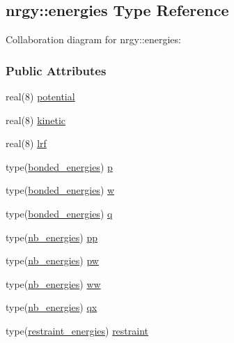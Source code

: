\hypertarget{structnrgy_1_1energies}{\subsection{nrgy\-:\-:energies Type Reference}
\label{structnrgy_1_1energies}
}


Collaboration diagram for nrgy\-:\-:energies\-:
\subsubsection*{Public Attributes}
\begin{DoxyCompactItemize}
\item 
real(8) \hyperlink{structnrgy_1_1energies_a6a5ddf1b45a4c196cbeab13812f80e52}{potential}
\item 
real(8) \hyperlink{structnrgy_1_1energies_abc42dff4be0871a59aa72f2e75e0d0e0}{kinetic}
\item 
real(8) \hyperlink{structnrgy_1_1energies_aa6aa6c3cc11f7938a3b912fd2a14ec42}{lrf}
\item 
type(\hyperlink{structnrgy_1_1bonded__energies}{bonded\-\_\-energies}) \hyperlink{structnrgy_1_1energies_ac8a23f682719e0af711eea372cceb264}{p}
\item 
type(\hyperlink{structnrgy_1_1bonded__energies}{bonded\-\_\-energies}) \hyperlink{structnrgy_1_1energies_a74c9c8861749056001bb7618310ce4e5}{w}
\item 
type(\hyperlink{structnrgy_1_1bonded__energies}{bonded\-\_\-energies}) \hyperlink{structnrgy_1_1energies_aca481dfb8bb5ae4155ef5072aa87eccb}{q}
\item 
type(\hyperlink{structnrgy_1_1nb__energies}{nb\-\_\-energies}) \hyperlink{structnrgy_1_1energies_ab5f70d1fcc0d9af5982cff6ebe21a60c}{pp}
\item 
type(\hyperlink{structnrgy_1_1nb__energies}{nb\-\_\-energies}) \hyperlink{structnrgy_1_1energies_aed1b82bfdc825e267d03fd9e85b79042}{pw}
\item 
type(\hyperlink{structnrgy_1_1nb__energies}{nb\-\_\-energies}) \hyperlink{structnrgy_1_1energies_a26d3929edff4f0828fea1b4aee6eb644}{ww}
\item 
type(\hyperlink{structnrgy_1_1nb__energies}{nb\-\_\-energies}) \hyperlink{structnrgy_1_1energies_a7d9210f0441cd8b7b41545abd3fe6da0}{qx}
\item 
type(\hyperlink{structnrgy_1_1restraint__energies}{restraint\-\_\-energies}) \hyperlink{structnrgy_1_1energies_abee183d6277134e1ef28eabc772cd291}{restraint}
\end{DoxyCompactItemize}


